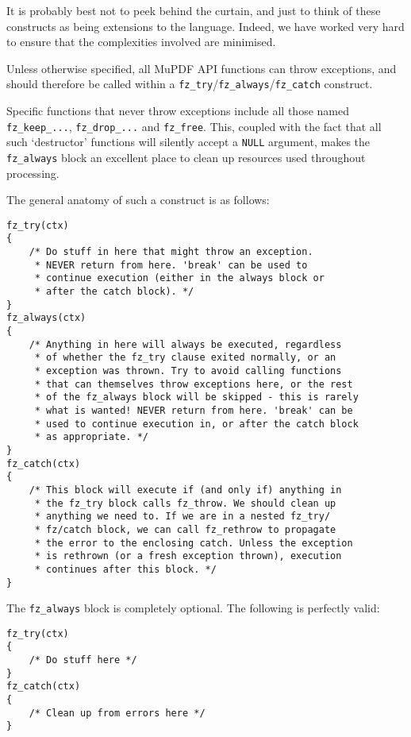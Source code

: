 \documentclass[oneside]{book}
\begin{document}
It is probably best not to peek behind the curtain, and just to think of these constructs as being extensions to the language. Indeed, we have worked very hard to ensure that the complexities involved are minimised.

Unless otherwise specified, all MuPDF API functions can throw exceptions, and should therefore be called within a \texttt{fz\_try}\slash\texttt{fz\_always}\slash\texttt{fz\_catch} construct.

Specific functions that never throw exceptions include all those named \texttt{fz\_keep\_...}, \texttt{fz\_drop\_...} and \texttt{fz\_free}. This, coupled with the fact that all such `destructor' functions will silently accept a \texttt{NULL} argument, makes the \texttt{fz\_always} block an excellent place to clean up resources used throughout processing.

The general anatomy of such a construct is as follows:

\begin{lstlisting}
fz_try(ctx)
{
    /* Do stuff in here that might throw an exception.
     * NEVER return from here. 'break' can be used to
     * continue execution (either in the always block or
     * after the catch block). */
}
fz_always(ctx)
{
    /* Anything in here will always be executed, regardless
     * of whether the fz_try clause exited normally, or an
     * exception was thrown. Try to avoid calling functions
     * that can themselves throw exceptions here, or the rest
     * of the fz_always block will be skipped - this is rarely
     * what is wanted! NEVER return from here. 'break' can be
     * used to continue execution in, or after the catch block
     * as appropriate. */
}
fz_catch(ctx)
{
    /* This block will execute if (and only if) anything in
     * the fz_try block calls fz_throw. We should clean up
     * anything we need to. If we are in a nested fz_try/
     * fz/catch block, we can call fz_rethrow to propagate
     * the error to the enclosing catch. Unless the exception
     * is rethrown (or a fresh exception thrown), execution
     * continues after this block. */
}
\end{lstlisting}

The \texttt{fz\_always} block is completely optional. The following is perfectly valid:

\begin{lstlisting}
fz_try(ctx)
{
    /* Do stuff here */
}
fz_catch(ctx)
{
    /* Clean up from errors here */
}
\end{lstlisting}
\end{document}
